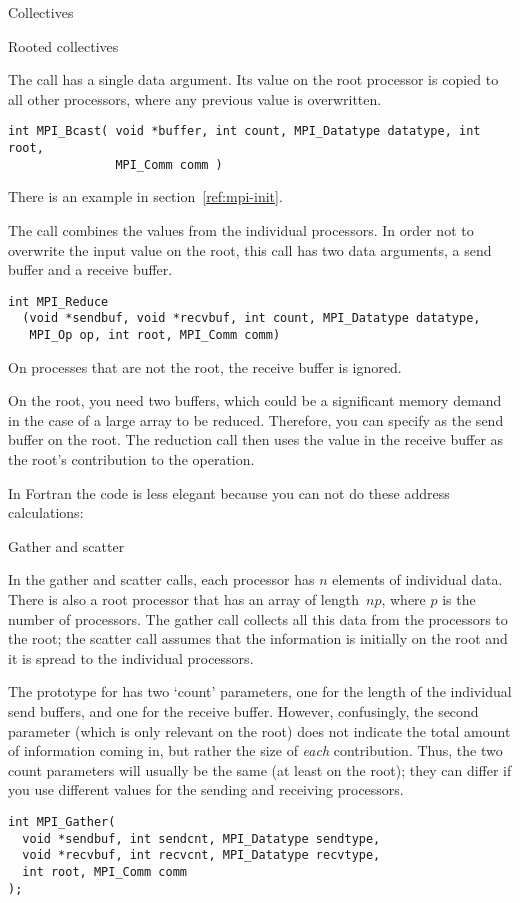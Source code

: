  {Collectives}

 {Rooted collectives}

The  call has a single data argument. Its
value on the root processor is copied to all other processors,
where any previous value is overwritten.
\begin{verbatim}
int MPI_Bcast( void *buffer, int count, MPI_Datatype datatype, int root, 
               MPI_Comm comm )
\end{verbatim}
There is an example in section~\ref{ref:mpi-init}.

The  call combines the values from the individual
processors. In order not to overwrite the input value on the root, 
this call has two data arguments, a send buffer and a receive buffer.
\begin{verbatim}
int MPI_Reduce
  (void *sendbuf, void *recvbuf, int count, MPI_Datatype datatype, 
   MPI_Op op, int root, MPI_Comm comm)
\end{verbatim}
On processes that are not the root, the receive buffer is ignored. 

On the root, 
you need two buffers, which could be a significant memory demand
in the case of a large array to be reduced.
Therefore, you can specify  as the send
buffer on the root. The reduction call then
uses the value in the receive buffer as the root's contribution to the operation.

In Fortran the code is less elegant because you can not do
these address calculations:

 {Gather and scatter}

In the gather and scatter calls, each processor has $n$ elements of individual
data. There is also a root processor that has an array of length~$np$, where $p$
is the number of processors. The gather call collects all this data from the 
processors to the root; the scatter call assumes that the information is 
initially on the root and it is spread to the individual processors.

The prototype for  has two `count' parameters, one
for the length of the individual send buffers, and one for the receive buffer.
However, confusingly, the second parameter (which is only relevant on the root)
does not indicate the total amount of information coming in, but
rather the size of \emph{each} contribution. Thus, the two count parameters
will usually be the same (at least on the root); they can differ if you 
use different  values for the sending and receiving
processors.
\begin{verbatim}
int MPI_Gather(
  void *sendbuf, int sendcnt, MPI_Datatype sendtype,
  void *recvbuf, int recvcnt, MPI_Datatype recvtype,
  int root, MPI_Comm comm
);
\end{verbatim}

